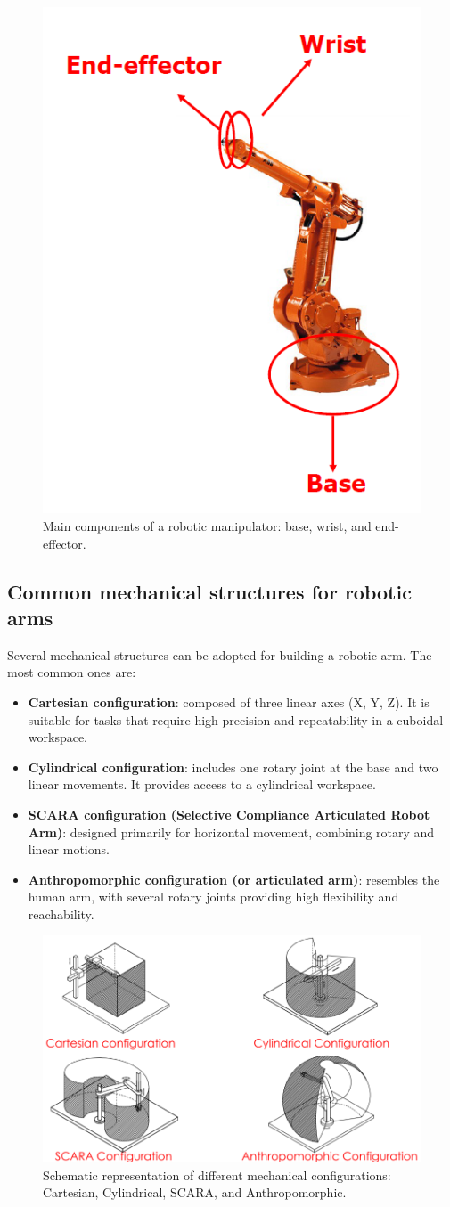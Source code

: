 \begin{figure}[H]
  \centering
  \includegraphics[width=0.35\linewidth]{imgs/manipulator_labeled.png}
  \caption{Main components of a robotic manipulator: base, wrist, and end-effector.}
\end{figure}

\subsection{Common mechanical structures for robotic arms}

Several mechanical structures can be adopted for building a robotic arm. The most common ones are:

\begin{itemize}
  \item \textbf{Cartesian configuration}: composed of three linear axes (X, Y, Z). It is suitable for tasks that require high precision and repeatability in a cuboidal workspace.
  \item \textbf{Cylindrical configuration}: includes one rotary joint at the base and two linear movements. It provides access to a cylindrical workspace.
  \item \textbf{SCARA configuration (Selective Compliance Articulated Robot Arm)}: designed primarily for horizontal movement, combining rotary and linear motions.
  \item \textbf{Anthropomorphic configuration (or articulated arm)}: resembles the human arm, with several rotary joints providing high flexibility and reachability.
\end{itemize}

\begin{figure}[H]
  \centering
  \includegraphics[width=0.8\linewidth]{imgs/mechanical_structures_schematic.png}
  \caption{Schematic representation of different mechanical configurations: Cartesian, Cylindrical, SCARA, and Anthropomorphic.}
\end{figure}

